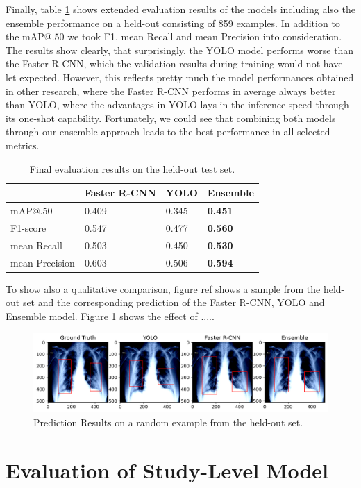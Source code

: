 Finally, table \ref{table:final_results} shows extended evaluation results of the models including also the ensemble performance on a held-out consisting of 859 examples. In addition to the \ac{mAP}@$.50$ we took F1, mean Recall and mean Precision into consideration. The results show clearly, that surprisingly, the \ac{YOLO} model performs worse than the Faster \ac{R-CNN}, which the validation results during training would not have let expected. However, this reflects pretty much the model performances obtained in other research, where the Faster \ac{R-CNN} performs in average always better than \ac{YOLO}, where the advantages in \ac{YOLO} lays in the inference speed through its one-shot capability. Fortunately, we could see that combining both models through our ensemble approach leads to the best performance in all selected metrics.

\begin{table}[h!]
	\begin{tabular}{l|l|l|l}
					&    Faster R-CNN          &         YOLO             &  Ensemble \\ \hline
	mAP@.50			& \multicolumn{1}{l|}{0.409} & \multicolumn{1}{l|}{0.345} & \textbf{0.451}  \\
	F1-score		& \multicolumn{1}{l|}{0.547} & \multicolumn{1}{l|}{0.477} & \textbf{0.560} \\
	mean Recall		& \multicolumn{1}{l|}{0.503} & \multicolumn{1}{l|}{0.450} & \textbf{0.530} \\
	mean Precision	& \multicolumn{1}{l|}{0.603} & \multicolumn{1}{l|}{0.506} & \textbf{0.594} \\
	\end{tabular}
\centering
\caption{Final evaluation results on the held-out test set.}
\label{table:final_results}
\end{table}

To show also a qualitative comparison, figure ref shows a sample from the held-out set and the corresponding prediction of the Faster \ac{R-CNN}, \ac{YOLO} and Ensemble model. Figure \ref{fig:combo_eval} shows the effect of .....

\begin{figure}[h]
	\centering
	\includegraphics[width=\linewidth]{img/combo.png}
	\caption{Prediction Results on a random example from the held-out set.}
	\label{fig:combo_eval}
\end{figure}

\section{Evaluation of Study-Level Model}

